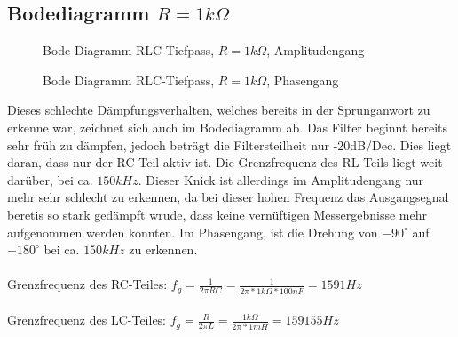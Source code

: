\subsection{Bodediagramm $R=1k\Omega$}

\begin{figure}[H]
  \centering
  \caption{Bode Diagramm RLC-Tiefpass, $R=1k\Omega$, Amplitudengang}
\end{figure}
\begin{figure}[H]
  \centering
  \caption{Bode Diagramm RLC-Tiefpass, $R=1k\Omega$, Phasengang}
\end{figure}
Dieses schlechte D\"ampfungsverhalten, welches bereits in der Sprunganwort zu erkenne war, zeichnet sich auch im Bodediagramm ab. Das Filter beginnt bereits sehr fr\"uh zu d\"ampfen, jedoch betr\"agt die Filtersteilheit nur -20dB/Dec. Dies liegt daran, dass nur der RC-Teil aktiv ist. Die Grenzfrequenz des RL-Teils liegt weit dar\"uber, bei ca. $150kHz$. Dieser Knick ist allerdings im Amplitudengang nur mehr sehr schlecht zu erkennen, da bei dieser hohen Frequenz das Ausgangsegnal beretis so stark ged\"ampft wrude, dass keine vern\"uftigen Messergebnisse mehr aufgenommen werden konnten. Im Phasengang, ist die Drehung von $-90^\circ$ auf $-180^\circ$ bei ca. $150kHz$ zu erkennen. \\ \\
Grenzfrequenz des RC-Teiles: $f_g=\frac{1}{2\pi RC}=\frac{1}{2\pi*1k\Omega *100nF}=1591Hz$ \\ \\
Grenzfrequenz des LC-Teiles: $f_g=\frac{R}{2\pi L} = \frac{1k\Omega}{2\pi*1mH}=159155Hz$

